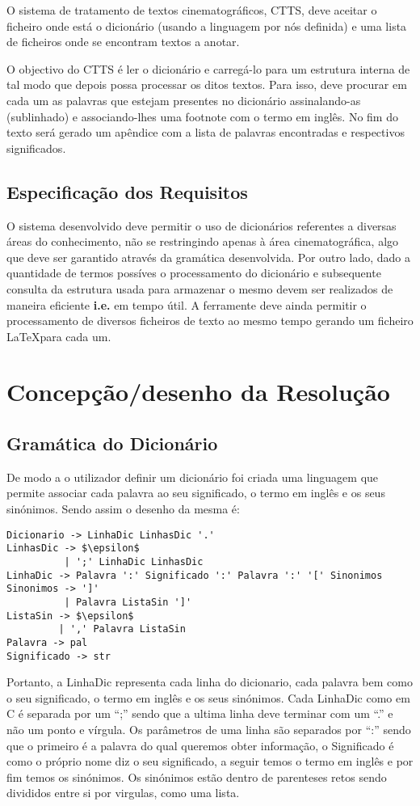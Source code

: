 \documentclass{llncs}
\begin{document}
O sistema de tratamento de textos cinematográficos, CTTS, deve aceitar o ficheiro onde está o dicionário (usando a linguagem por nós definida) e uma lista de ficheiros onde se encontram textos a anotar.

O objectivo do CTTS é ler o dicionário e carregá-lo para um estrutura interna de tal modo que depois possa processar os ditos textos. Para isso, deve procurar em cada um as palavras que estejam presentes no dicionário assinalando-as (sublinhado) e associando-lhes uma footnote com o termo em inglês. No fim do texto será gerado um apêndice com a lista de palavras encontradas e respectivos significados.

\subsection{Especificação dos Requisitos}
O sistema desenvolvido deve permitir o uso de dicionários referentes a diversas áreas do conhecimento, não se restringindo apenas à área cinematográfica, algo que deve ser garantido através da gramática desenvolvida. Por outro lado, dado a quantidade de termos possíves o processamento do dicionário e subsequente consulta da estrutura usada para armazenar o mesmo devem ser realizados de maneira eficiente \textbf{i.e.} em tempo útil. A ferramente deve ainda permitir o processamento de diversos ficheiros de texto ao mesmo tempo gerando um ficheiro \LaTeX para cada um.

\section{Concepção/desenho da Resolução}

\subsection{Gramática do Dicionário}
De modo a o utilizador definir um dicionário foi criada uma linguagem que permite associar cada palavra ao seu significado, o termo em inglês e os seus sinónimos. Sendo assim o desenho da mesma é:
\begin{lstlisting}[mathescape]
Dicionario -> LinhaDic LinhasDic '.' 
LinhasDic -> $\epsilon$ 
          | ';' LinhaDic LinhasDic 
LinhaDic -> Palavra ':' Significado ':' Palavra ':' '[' Sinonimos 
Sinonimos -> ']' 
          | Palavra ListaSin ']' 
ListaSin -> $\epsilon$ 
         | ',' Palavra ListaSin 
Palavra -> pal 
Significado -> str 
\end{lstlisting}
Portanto, a LinhaDic representa cada linha do dicionario, cada palavra bem como o seu significado, o termo em inglês e os seus sinónimos. Cada LinhaDic como em C é separada por um ``;'' sendo que a ultima linha deve terminar com um ``.'' e não um ponto e vírgula. Os parâmetros de uma linha são separados por ``:'' sendo que o primeiro é a palavra do qual queremos obter informação, o Significado é como o próprio nome diz o seu significado, a seguir temos o termo em inglês e por fim temos os sinónimos. Os sinónimos estão dentro de parenteses retos sendo divididos entre si por virgulas, como uma lista.
\end{document}
